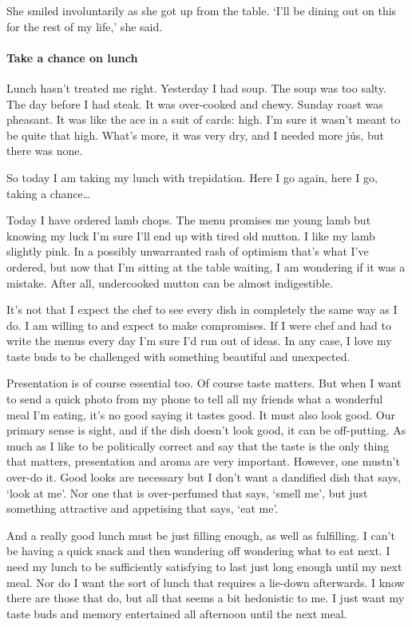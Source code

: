 She smiled involuntarily as she got up from the table.  `I'll be
dining out on this for the rest of my life,' she said.

\fugue

\paragraph{Take a chance on lunch}\strut

Lunch hasn't treated me right. Yesterday I had soup. The soup was too
salty. The day before I had steak. It was over-cooked and
chewy. Sunday roast was pheasant. It was like the ace in a suit of
cards: high. I'm sure it wasn't meant to be quite that high. What's more, it
was very dry, and I needed more jús, but there was none.

So today I am taking my lunch with trepidation. Here I go again, here
I go, taking a chance…

Today I have ordered lamb chops. The menu promises me young lamb but
knowing my luck I'm sure I'll end up with tired old mutton. I like my
lamb slightly pink. In a possibly unwarranted rash of optimism that's
what I've ordered, but now that I'm sitting at the table waiting, I am
wondering if it was a mistake. After all, undercooked mutton can be
almost indigestible.

It's not that I expect the chef to see every dish in completely
the same way as I do. I am willing to and expect to make compromises. If I
were chef and had to write the menus every day I'm sure I'd run out of
ideas. In any case, I love my taste buds to be challenged with something
beautiful and unexpected.

Presentation is of course essential too. 
Of course taste matters. But when I want to send a quick photo from my
phone to tell all my friends what a wonderful meal I'm eating, it's no
good saying it tastes good. It must also look good.
Our primary sense is sight,
and if the dish doesn't look good, it can be off-putting. As much as I
like to be politically correct and say that the taste is the only thing
that matters, presentation and aroma are very important. However, one
mustn't over-do it. Good looks are necessary but I don't want a
dandified dish that says, `look at me'. Nor one that is over-perfumed
that says, `smell me', but just something attractive and appetising
that says, `eat me'.

And a really good lunch must be just filling enough, as well as fulfilling. I
can't be having a quick snack and then wandering off wondering what to
eat next. I need my lunch to be sufficiently satisfying to
last just long enough
until my next meal. Nor do I want the sort of lunch that requires a 
lie-down afterwards. I know there are those that do, but all that seems a
bit hedonistic to me.  I just want my taste buds and memory entertained all
afternoon until the next meal.

